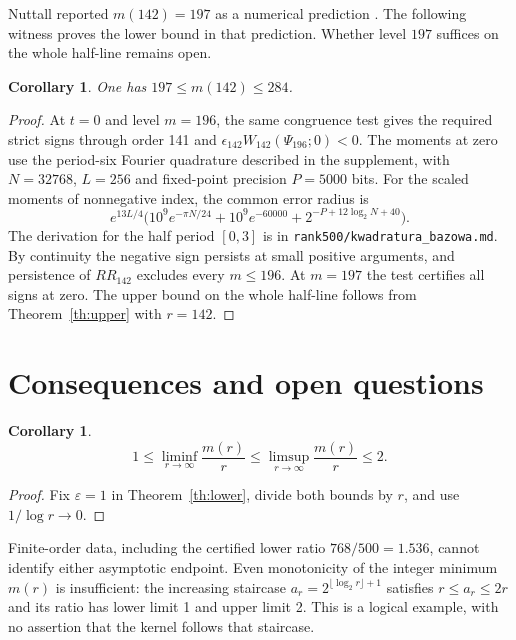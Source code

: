 \documentclass[11pt,a4paper,reqno]{amsart}
\newtheorem{corollary}[theorem]{Corollary}
\numberwithin{equation}{section}
\begin{document}
Nuttall reported \(m(142)=197\) as a numerical prediction \cite[(1.5)]{nuttallsplit}. The following witness proves the lower bound in that prediction. Whether level \(197\) suffices on the whole half-line remains open.

\begin{corollary}\label{cor:witness142}
One has \(197\le m(142)\le284\).
\end{corollary}
\begin{proof}
At \(t=0\) and level \(m=196\), the same congruence test gives the required strict signs through order 141 and \(\epsilon_{142}W_{142}(\Psi_{196};0)<0\). The moments at zero use the period-six Fourier quadrature described in the supplement, with \(N=32768\), \(L=256\) and fixed-point precision \(P=5000\) bits. For the scaled moments of nonnegative index, the common error radius is \[e^{13L/4}\big(10^9e^{-\pi N/24}+10^9e^{-60000}+2^{-P+12\log_2 N+40}\big).\] The derivation for the half period \([0,3]\) is in \texttt{rank500/kwadratura\_bazowa.md}. By continuity the negative sign persists at small positive arguments, and persistence of \(RR_{142}\) excludes every \(m\le196\). At \(m=197\) the test certifies all signs at zero. The upper bound on the whole half-line follows from Theorem~\ref{th:upper} with \(r=142\).
\end{proof}

\section{Consequences and open questions}\label{sec:consequences}


\begin{corollary}\label{cor:asym}
\[1\le\liminf_{r\to\infty}\frac{m(r)}r\le\limsup_{r\to\infty}\frac{m(r)}r\le2.\]
\end{corollary}


\begin{proof}
Fix \(\varepsilon=1\) in Theorem~\ref{th:lower}, divide both bounds by \(r\), and use \(1/\log r\to0\).
\end{proof}


Finite-order data, including the certified lower ratio \(768/500=1.536\), cannot identify either asymptotic endpoint. Even monotonicity of the integer minimum \(m(r)\) is insufficient: the increasing staircase \(a_r=2^{\lfloor\log_2 r\rfloor+1}\) satisfies \(r\le a_r\le2r\) and its ratio has lower limit 1 and upper limit 2. This is a logical example, with no assertion that the kernel follows that staircase.
\end{document}
